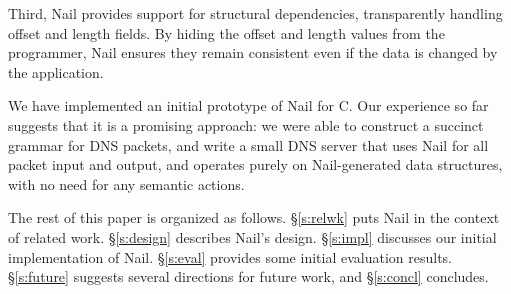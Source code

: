 Third, Nail provides support for structural dependencies, transparently handling
offset and length fields. By hiding the offset and length values from the
programmer, Nail ensures they remain consistent even if the data is changed by
the application. 



We have implemented an initial prototype of Nail for C\@.  Our experience
so far suggests that it is a promising approach: we were able to construct
a succinct grammar for DNS packets, and write a small DNS server that
uses Nail for all packet input and output, and operates purely on
Nail-generated data structures, with no need for any semantic actions.

The rest of this paper is organized as follows.  \S\ref{s:relwk}
puts Nail in the context of related work.  \S\ref{s:design} describes
Nail's design.  \S\ref{s:impl} discusses our initial implementation
of Nail.  \S\ref{s:eval} provides some initial evaluation results.
\S\ref{s:future} suggests several directions for future work, and
\S\ref{s:concl} concludes.

